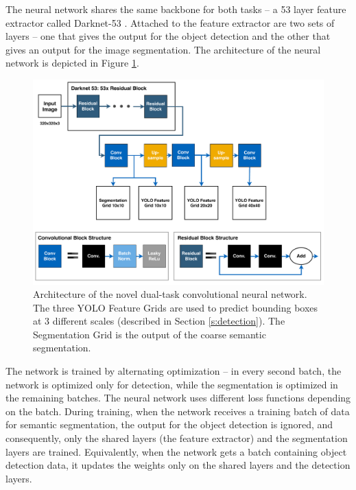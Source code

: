 \documentclass{ctuthesis/ctuthesis}
\begin{document}
The neural network shares the same backbone for both tasks -- a 53 layer feature extractor called Darknet-53 \cite{YOLOv3}. Attached to the feature extractor are two sets of layers -- one that gives the output for the object detection and the other that gives an output for the image segmentation. The architecture of the neural network is depicted in Figure \ref{f:dual_task}.\par


\begin{figure}[]
    \centering
    \includegraphics[width=1\textwidth]{images/network_architecture.pdf}
    
    \caption[Architecture of the novel dual-task convolutional neural network]{Architecture of the novel dual-task convolutional neural network. The three YOLO Feature Grids are used to predict bounding boxes at 3 different scales (described in Section \ref{s:detection}). The Segmentation Grid is the output of the coarse semantic segmentation. }\label{f:dual_task}
\end{figure}



The network is trained by alternating optimization -- in every second batch, the network is optimized only for detection, while the segmentation is optimized in the remaining batches. The neural network uses different loss functions depending on the batch. During training, when the network receives a training batch of data for semantic segmentation, the output for the object detection is ignored, and consequently, only the shared layers (the feature extractor) and the segmentation layers are trained. Equivalently, when the network gets a batch containing object detection data, it updates the weights only on the shared layers and the detection layers. \par
\end{document}
